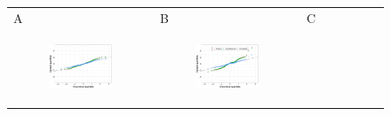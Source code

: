\documentclass[11pt]{article}
\begin{document}
\begin{figure}[ht]
	\begin{tabular}{lll}
	A&B&C\\
	\begin{subfigure}[t]{0.3\linewidth}
		\centering
		\includegraphics[width=1\linewidth]{figs/figure-5a.pdf} 
	\end{subfigure}&
	\begin{subfigure}[t]{0.3\linewidth}
		\centering
		\includegraphics[width=1\linewidth]{figs/figure-5b.pdf}
	\end{subfigure}&
	\begin{subfigure}[t]{0.3\linewidth}
		\centering

\end{subfigure}
\end{tabular}
\end{figure}
\end{document}
